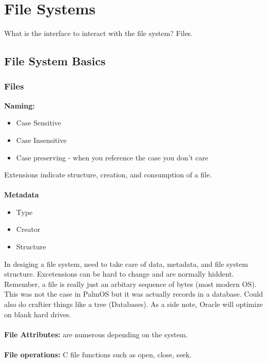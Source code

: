 \documentclass[../base_file/cs1550_notes.tex]{subfiles}
\begin{document}
\chapter{File Systems}
What is the interface to interact with the file system? Files.
\section{File System Basics}
\subsection{Files}
\textbf{Naming:}
\begin{itemize}
	\item Case Sensitive
	\item Case Insensitive
	\item Case preserving - when you reference the case you don't care
\end{itemize}
Extensions indicate structure, creation, and consumption of a file.\\\\
\textbf{Metadata}
\begin{itemize}
		\item Type
		\item Creator
		\item Structure
\end{itemize}
In desiging a file system, need to take care of data, metadata, and file
system structure.  Excetensions can be hard to change and are normally
hiddent.  Remember, a file is really just an arbitary sequence of bytes 
(most modern OS).  This was not the case in PalmOS but it was actually
records in a database.  Could also do craftier things like a tree
(Databases). As a side note, Oracle will optimize on blank hard drives.\\\\
\textbf{File Attributes:} are numerous depending on the system.\\\\
\textbf{File operations:} C file functions such as open, close, seek. 
\end{document}
